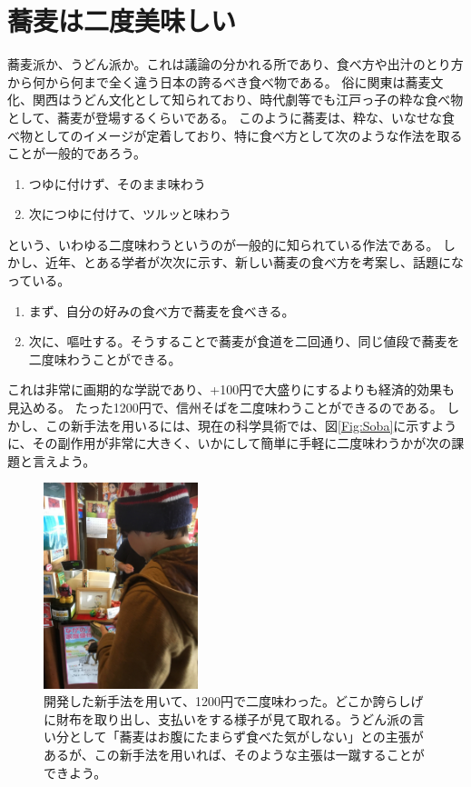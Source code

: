 \section{蕎麦は二度美味しい}
蕎麦派か、うどん派か。これは議論の分かれる所であり、食べ方や出汁のとり方から何から何まで全く違う日本の誇るべき食べ物である。
俗に関東は蕎麦文化、関西はうどん文化として知られており、時代劇等でも江戸っ子の粋な食べ物として、蕎麦が登場するくらいである。
このように蕎麦は、粋な、いなせな食べ物としてのイメージが定着しており、特に食べ方として次のような作法を取ることが一般的であろう。
\begin{enumerate}
\item つゆに付けず、そのまま味わう
\item 次につゆに付けて、ツルッと味わう
\end{enumerate}
という、いわゆる二度味わうというのが一般的に知られている作法である。
しかし、近年、とある学者が次次に示す、新しい蕎麦の食べ方を考案し、話題になっている。
\begin{enumerate}
\item まず、自分の好みの食べ方で蕎麦を食べきる。
\item 次に、嘔吐する。そうすることで蕎麦が食道を二回通り、同じ値段で蕎麦を二度味わうことができる。
\end{enumerate}
これは非常に画期的な学説であり、+100円で大盛りにするよりも経済的効果も見込める。
たった1200円で、信州そばを二度味わうことができるのである。
しかし、この新手法を用いるには、現在の科学具術では、図\ref{Fig:Soba}に示すように、その副作用が非常に大きく、いかにして簡単に手軽に二度味わうかが次の課題と言えよう。

\begin{figure}[h]
\centering
\includegraphics[width=0.4\textwidth]{./section/Shokuji/figures/SobaNido.jpg}

  \caption{開発した新手法を用いて、1200円で二度味わった。どこか誇らしげに財布を取り出し、支払いをする様子が見て取れる。うどん派の言い分として「蕎麦はお腹にたまらず食べた気がしない」との主張があるが、この新手法を用いれば、そのような主張は一蹴することができよう。}
\label{Fig:SobaNido}
\end{figure}



